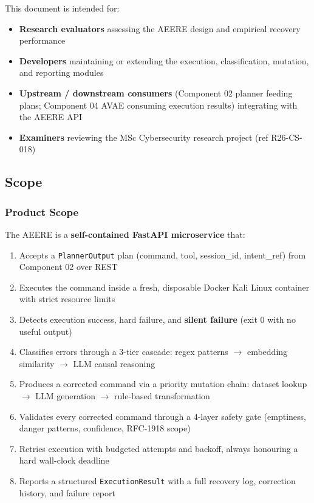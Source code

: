 \documentclass[10pt,journal,onecolumn]{IEEEtran}
\begin{document}
This document is intended for:

\begin{itemize}
\item \textbf{Research evaluators} assessing the AEERE design and empirical recovery performance
\item \textbf{Developers} maintaining or extending the execution, classification, mutation, and reporting modules
\item \textbf{Upstream / downstream consumers} (Component 02 planner feeding plans; Component 04 AVAE consuming execution results) integrating with the AEERE API
\item \textbf{Examiners} reviewing the MSc Cybersecurity research project (ref R26-CS-018)
\end{itemize}

\subsection{Scope}

\subsubsection{Product Scope}

The AEERE is a \textbf{self-contained FastAPI microservice} that:

\begin{enumerate}
\item Accepts a \texttt{PlannerOutput} plan (command, tool, session\_id, intent\_ref) from Component 02 over REST
\item Executes the command inside a fresh, disposable Docker Kali Linux container with strict resource limits
\item Detects execution success, hard failure, and \textbf{silent failure} (exit 0 with no useful output)
\item Classifies errors through a 3-tier cascade: regex patterns $\rightarrow$ embedding similarity $\rightarrow$ LLM causal reasoning
\item Produces a corrected command via a priority mutation chain: dataset lookup $\rightarrow$ LLM generation $\rightarrow$ rule-based transformation
\item Validates every corrected command through a 4-layer safety gate (emptiness, danger patterns, confidence, RFC-1918 scope)
\item Retries execution with budgeted attempts and backoff, always honouring a hard wall-clock deadline
\item Reports a structured \texttt{ExecutionResult} with a full recovery log, correction history, and failure report
\end{enumerate}
\end{document}
